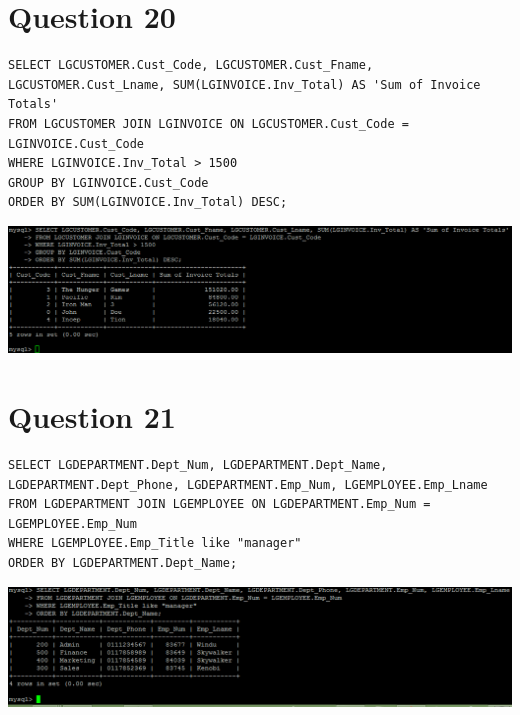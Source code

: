 \documentclass[a4paper,10pt]{article}
\begin{document}
\section {Question 20}
\lstset{
            language=SQL,
            breaklines=true
            }
        \begin{lstlisting}[frame=single]
        SELECT LGCUSTOMER.Cust_Code, LGCUSTOMER.Cust_Fname, LGCUSTOMER.Cust_Lname, SUM(LGINVOICE.Inv_Total) AS 'Sum of Invoice Totals'
FROM LGCUSTOMER JOIN LGINVOICE ON LGCUSTOMER.Cust_Code = LGINVOICE.Cust_Code
WHERE LGINVOICE.Inv_Total > 1500
GROUP BY LGINVOICE.Cust_Code
ORDER BY SUM(LGINVOICE.Inv_Total) DESC;

        \end{lstlisting}
\includegraphics{Queries/Question_20/Question_20_screenshot.PNG}
\section {Question 21}
\lstset{
            language=SQL,
            breaklines=true
            }
        \begin{lstlisting}[frame=single]
        SELECT LGDEPARTMENT.Dept_Num, LGDEPARTMENT.Dept_Name, LGDEPARTMENT.Dept_Phone, LGDEPARTMENT.Emp_Num, LGEMPLOYEE.Emp_Lname
FROM LGDEPARTMENT JOIN LGEMPLOYEE ON LGDEPARTMENT.Emp_Num = LGEMPLOYEE.Emp_Num
WHERE LGEMPLOYEE.Emp_Title like "manager"
ORDER BY LGDEPARTMENT.Dept_Name;

        \end{lstlisting}
\includegraphics{Queries/Question_21/Question_21_screenshot.PNG}
\end{document}
